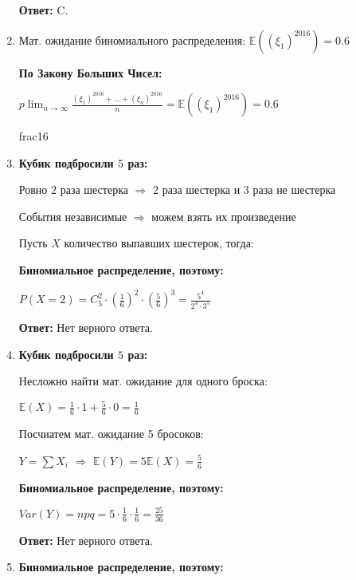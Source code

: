 \documentclass[a4paper]{article} %
\begin{document}
\begin{enumerate}
    
    \textbf{Ответ:} C.
    
    
    \item
    Мат. ожидание биномиального распределения: $\mathbb{E}((\xi_1)^{2016}) = 0.6$
    
    \textbf{По Закону Больших Чисел:}
    
    $ p\lim_{n\to\infty} \frac{(\xi_1)^{2016} + ... + (\xi_n)^{2016}}{n} = \mathbb{E}((\xi_1)^{2016}) = 0.6 $ 
    
    
    frac{1}{6}
    
    
    
    
    
    
    
    
    \item
    \textbf{Кубик подбросили $5$ раз:}
    
    Ровно $2$ раза шестерка $\Rightarrow$ $2$ раза шестерка и  $3$ раза не шестерка
     
    События независимые $\Rightarrow$ можем взять их произведение
    
    Пусть $X$ количество выпавших шестерок, тогда:
    
    \textbf{Биномиальное распределение, поэтому:}
    
    $P(X=2) = C_5^2 \cdot(\frac{1}{6})^2 \cdot (\frac{5}{6})^3 = \frac{5^4}{2^4\cdot3^5}$
    
    \textbf{Ответ:} Нет верного ответа.
    
    
    
    
    
    \item
    \textbf{Кубик подбросили $5$ раз:}
    
    Несложно найти мат. ожидание для одного броска:
    
    $\mathbb{E}(X) = \frac{1}{6}\cdot1 + \frac{5}{6}\cdot0 = \frac{1}{6}$
    
    Посчиатем мат. ожидание 5 бросоков:

    $Y = \sum X_i$ $\Rightarrow$ $\mathbb{E}(Y) = 5\mathbb{E}(X) = \frac{5}{6}$
    
    \textbf{Биномиальное распределение, поэтому:}
    
    $Var(Y) = npq = 5 \cdot \frac{1}{6} \cdot \frac{1}{6} = \frac{25}{36} $ 
    
    \textbf{Ответ:} Нет верного ответа.
    
    
    
    \item
    \textbf{Биномиальное распределение, поэтому:}
    

\end{enumerate}
\end{document}
